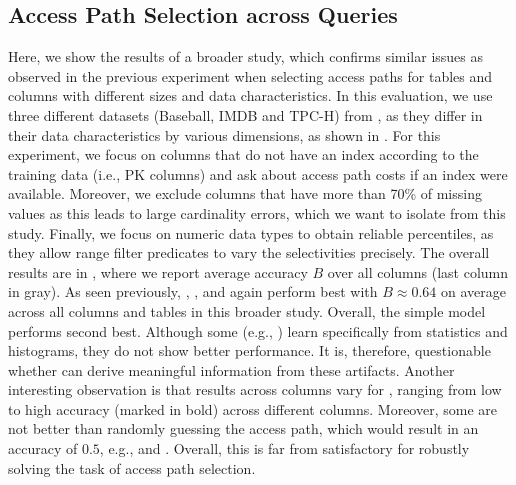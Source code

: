 \subsection{Access Path Selection across Queries}
Here, we show the results of a broader study, which confirms similar issues as observed in the previous experiment when selecting access paths for tables and columns with different sizes and data characteristics. 
In this evaluation, we use three different datasets (Baseball, IMDB and TPC-H) from \cite{hilprecht2022}, as they differ in their data characteristics by various dimensions, as shown in .
For this experiment, we focus on columns that do not have an index according to the training data (i.e., PK columns) and ask \lcms about access path costs if an index were available. 
Moreover, we exclude columns that have more than 70\% of missing values as this leads to large cardinality errors, which we want to isolate from this study.
Finally, we focus on numeric data types to obtain reliable percentiles, as they allow range filter predicates to vary the selectivities precisely.
The overall results are in , where we report average accuracy $B$ over all columns (last column in gray).
As seen previously, \postgresx, \postgresxvi, and \dace again perform best with $B\approx 0.64$ on average across all columns and tables in this broader study.
Overall, the simple \flatvector model performs second best.
Although some \lcms (e.g., \qppnet) learn specifically from statistics and histograms, they do not show better performance.
It is, therefore, questionable whether \lcms can derive meaningful information from these artifacts.
Another interesting observation is that results across columns vary for \lcms, ranging from low to high accuracy (marked in bold) across different columns.
Moreover, some \lcms are not better than randomly guessing the access path, which would result in an accuracy of $0.5$, e.g., \queryformer and \qppnet.
Overall, this is far from satisfactory for robustly solving the task of access path selection.




